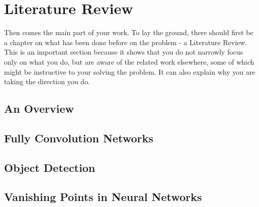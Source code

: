 
\chapter{Literature Review}
\label{cha:literature}
\begin{spacing}{1.5}
\setlength{\parskip}{0.3in}

Then comes the main part of your work. To lay the ground, there should first be a chapter on what has been done before on the problem - a Literature Review. This is an important section because it shows that you do not narrowly focus only on what you do, but are aware of the
related work elsewhere, some of which might be instructive to your solving the problem. It can also explain why you are taking the direction you do.

\section{An Overview}
\label{sec:LR_overview}



\section{Fully Convolution Networks}
\label{sec:LR_FCN}



\section{Object Detection}
\label{sec:LR_objectdetection}



\section{Vanishing Points in Neural Networks}
\label{sec:LR_vpinNN}



\end{spacing}
\newpage

